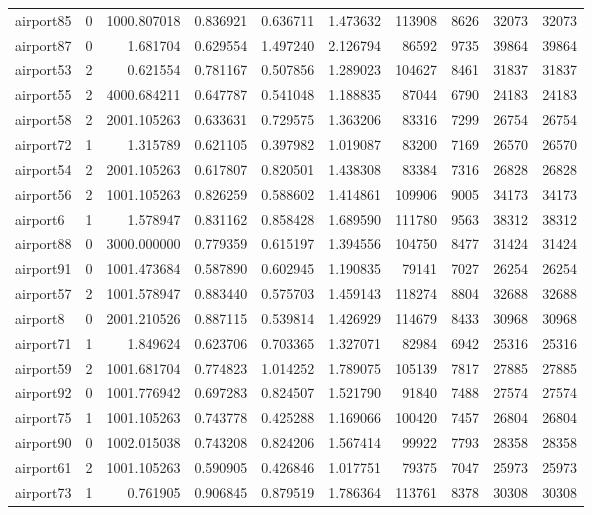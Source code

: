\begin{longtable}{|l|r|r|r|r|r|r|r|r|r|}
airport85 & 0 & 1000.807018 & 0.836921 & 0.636711 & 1.473632 & 113908 & 8626 & 32073 & 32073 \\
airport87 & 0 & 1.681704 & 0.629554 & 1.497240 & 2.126794 & 86592 & 9735 & 39864 & 39864 \\
airport53 & 2 & 0.621554 & 0.781167 & 0.507856 & 1.289023 & 104627 & 8461 & 31837 & 31837 \\
airport55 & 2 & 4000.684211 & 0.647787 & 0.541048 & 1.188835 & 87044 & 6790 & 24183 & 24183 \\
airport58 & 2 & 2001.105263 & 0.633631 & 0.729575 & 1.363206 & 83316 & 7299 & 26754 & 26754 \\
airport72 & 1 & 1.315789 & 0.621105 & 0.397982 & 1.019087 & 83200 & 7169 & 26570 & 26570 \\
airport54 & 2 & 2001.105263 & 0.617807 & 0.820501 & 1.438308 & 83384 & 7316 & 26828 & 26828 \\
airport56 & 2 & 1001.105263 & 0.826259 & 0.588602 & 1.414861 & 109906 & 9005 & 34173 & 34173 \\
airport6 & 1 & 1.578947 & 0.831162 & 0.858428 & 1.689590 & 111780 & 9563 & 38312 & 38312 \\
airport88 & 0 & 3000.000000 & 0.779359 & 0.615197 & 1.394556 & 104750 & 8477 & 31424 & 31424 \\
airport91 & 0 & 1001.473684 & 0.587890 & 0.602945 & 1.190835 & 79141 & 7027 & 26254 & 26254 \\
airport57 & 2 & 1001.578947 & 0.883440 & 0.575703 & 1.459143 & 118274 & 8804 & 32688 & 32688 \\
airport8 & 0 & 2001.210526 & 0.887115 & 0.539814 & 1.426929 & 114679 & 8433 & 30968 & 30968 \\
airport71 & 1 & 1.849624 & 0.623706 & 0.703365 & 1.327071 & 82984 & 6942 & 25316 & 25316 \\
airport59 & 2 & 1001.681704 & 0.774823 & 1.014252 & 1.789075 & 105139 & 7817 & 27885 & 27885 \\
airport92 & 0 & 1001.776942 & 0.697283 & 0.824507 & 1.521790 & 91840 & 7488 & 27574 & 27574 \\
airport75 & 1 & 1001.105263 & 0.743778 & 0.425288 & 1.169066 & 100420 & 7457 & 26804 & 26804 \\
airport90 & 0 & 1002.015038 & 0.743208 & 0.824206 & 1.567414 & 99922 & 7793 & 28358 & 28358 \\
airport61 & 2 & 1001.105263 & 0.590905 & 0.426846 & 1.017751 & 79375 & 7047 & 25973 & 25973 \\
airport73 & 1 & 0.761905 & 0.906845 & 0.879519 & 1.786364 & 113761 & 8378 & 30308 & 30308 \\

\end{longtable}
